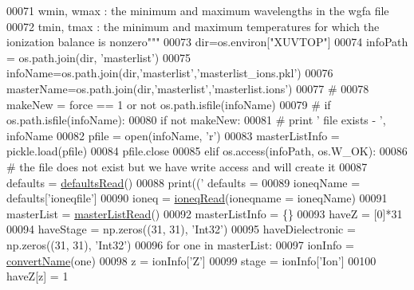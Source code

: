 \begin{DoxyCode}
{00071 \textcolor{stringliteral}{    wmin, wmax :  the minimum and maximum wavelengths in the wgfa file}
00072 \textcolor{stringliteral}{    tmin, tmax :  the minimum and maximum temperatures for which the ionization balance is nonzero"""}
00073     dir=os.environ[\textcolor{stringliteral}{"XUVTOP"}]
00074     infoPath = os.path.join(dir, \textcolor{stringliteral}{'masterlist'})
00075     infoName=os.path.join(dir,\textcolor{stringliteral}{'masterlist'},\textcolor{stringliteral}{'masterlist\_ions.pkl'})
00076     masterName=os.path.join(dir,\textcolor{stringliteral}{'masterlist'},\textcolor{stringliteral}{'masterlist.ions'})
00077     \textcolor{comment}{#}
00078     makeNew = force == 1 \textcolor{keywordflow}{or} \textcolor{keywordflow}{not} os.path.isfile(infoName)
00079 \textcolor{comment}{#    if os.path.isfile(infoName):}
00080     \textcolor{keywordflow}{if} \textcolor{keywordflow}{not} makeNew:
00081 \textcolor{comment}{#       print ' file exists - ',  infoName}
00082         pfile = open(infoName, \textcolor{stringliteral}{'}\textcolor{stringliteral}{r')}
00083 \textcolor{stringliteral}{        masterListInfo = pickle.load(pfile)}
00084 \textcolor{stringliteral}{        pfile.close}
00085 \textcolor{stringliteral}{    }\textcolor{keywordflow}{elif} os.access(infoPath, os.W\_OK):
00086         \textcolor{comment}{# the file does not exist but we have write access and will create it}
00087         defaults = \hyperlink{namespacepyneb_1_1utils_1_1__chianti__tools_a235ada2c4e384f436dbade0913107585}{defaultsRead}()
00088         print((\textcolor{stringliteral}{' defaults = %
00089         ioneqName = defaults[\textcolor{stringliteral}{'ioneqfile'}]
00090         ioneq = \hyperlink{namespacepyneb_1_1utils_1_1__chianti__tools_a8b6257cfe133ac906966b20c8721f82a}{ioneqRead}(ioneqname = ioneqName)
00091         masterList = \hyperlink{namespacepyneb_1_1utils_1_1__chianti__tools_a1a4447320a9d614f994bc538890c32cd}{masterListRead}()
00092         masterListInfo = \{\}
00093         haveZ = [0]*31
00094         haveStage = np.zeros((31, 31), \textcolor{stringliteral}{'Int32'})
00095         haveDielectronic = np.zeros((31, 31), \textcolor{stringliteral}{'Int32'})
00096         \textcolor{keywordflow}{for} one \textcolor{keywordflow}{in} masterList:
00097             ionInfo = \hyperlink{namespacepyneb_1_1utils_1_1__chianti__tools_a92cf299ad3407ee8923739e2761ab13f}{convertName}(one)
00098             z = ionInfo[\textcolor{stringliteral}{'Z'}]
00099             stage = ionInfo[\textcolor{stringliteral}{'Ion'}]
00100             haveZ[z] = 1
}}
\end{DoxyCode}
